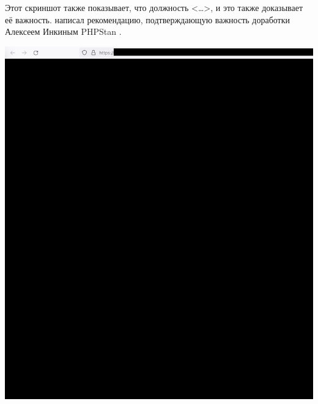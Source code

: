 
Этот скриншот также показывает, что должность <\dots>,
и это также доказывает её важность.
\MrPhpTwo написал рекомендацию, подтверждающую важность доработки Алексеем Инкиным PHPStan .

\begin{center}
    \includegraphics[width=36em]{php-two-company-role_public}
\end{center}

\pagebreak
